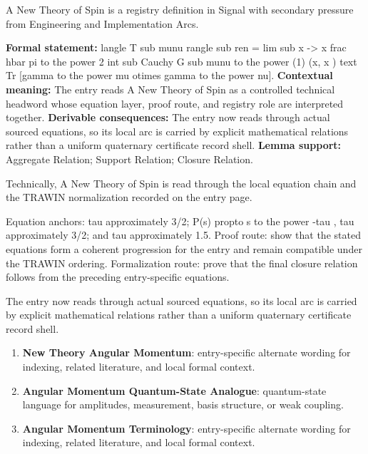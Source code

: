 
\begingroup\small
{}
A New Theory of Spin is a registry definition in Signal with secondary pressure from Engineering and Implementation Arcs.

\begingroup\footnotesize\setlength{\emergencystretch}{3em}\sloppy
\textbf{Formal statement:} langle T sub munu rangle sub ren = lim sub x -> x frac hbar pi to the power 2 int sub Cauchy G sub munu to the power (1) (x, x ) text Tr [gamma to the power mu otimes gamma to the power nu]. \textbf{Contextual meaning:} The entry reads A New Theory of Spin as a controlled technical headword whose equation layer, proof route, and registry role are interpreted together. \textbf{Derivable consequences:} The entry now reads through actual sourced equations, so its local arc is carried by explicit mathematical relations rather than a uniform quaternary certificate record shell. \textbf{Lemma support:} Aggregate Relation; Support Relation; Closure Relation.\par
\endgroup

Technically, A New Theory of Spin is read through the local equation chain and the TRAWIN normalization recorded on the entry page.

Equation anchors: tau approximately 3/2; P(s) propto s to the power -tau , tau approximately 3/2; and tau approximately 1.5. Proof route: show that the stated equations form a coherent progression for the entry and remain compatible under the TRAWIN ordering. Formalization route: prove that the final closure relation follows from the preceding entry-specific equations.

The entry now reads through actual sourced equations, so its local arc is carried by explicit mathematical relations rather than a uniform quaternary certificate record shell.
\endgroup

\begin{enumerate}[leftmargin=1.6em,itemsep=6pt,topsep=4pt]
\item \textbf{New Theory Angular Momentum}: entry-specific alternate wording for indexing, related literature, and local formal context.
\item \textbf{Angular Momentum Quantum-State Analogue}: quantum-state language for amplitudes, measurement, basis structure, or weak coupling.
\item \textbf{Angular Momentum Terminology}: entry-specific alternate wording for indexing, related literature, and local formal context.
\end{enumerate}

